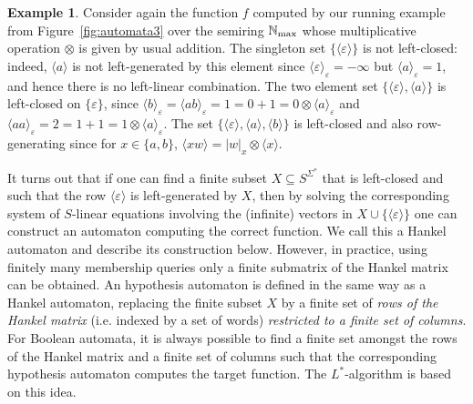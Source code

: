 \documentclass[10pt,a4paper]{amsart}
\theoremstyle{definition}
\newtheorem{exa}[thm]{Example}
\numberwithin{equation}{section}
\numberwithin{theorem}{section}
\begin{document}
\begin{exa}
Consider again the function $f$ computed by our running example from Figure~\ref{fig:automata3} over the semiring $\mathbb{N}_{\rm max}$ whose multiplicative operation $\otimes$ is given by usual addition. The singleton set $\{\langle \varepsilon \rangle\}$ is not left-closed: indeed, $\langle a \rangle$ is not left-generated by this element since $\langle \varepsilon \rangle_\varepsilon = -\infty$ but $\langle a \rangle_\varepsilon = 1$, and hence there is no left-linear combination. The two element set $\{\langle \varepsilon \rangle, \langle a \rangle\}$ is left-closed  on $\{\varepsilon\}$, since $\langle b \rangle_\varepsilon =  \langle ab \rangle_\varepsilon = 1 = 0+1 = 0 \otimes \langle a \rangle_\varepsilon$ and $\langle aa \rangle_\varepsilon = 2 = 1+1 = 1 \otimes \langle a \rangle_\varepsilon$. The set $\{\langle \varepsilon \rangle, \langle a \rangle, \langle b \rangle \}$ is left-closed  and also row-generating since for $x \in \{a,b\}$, $\langle xw \rangle = |w|_x \otimes \langle x \rangle$.
\end{exa}

It turns out that if one can find a finite  subset  $X \subseteq S^{\Sigma^*}$ that is left-closed and such that the row $\langle \varepsilon \rangle$ is left-generated by $X$, then by solving the corresponding system of $S$-linear equations involving the (infinite) vectors in $X \cup \{\langle \varepsilon\rangle\}$ one can construct an automaton computing the correct function. We call this a Hankel automaton and describe its construction below. However, in practice, using finitely many membership queries only a finite submatrix of the Hankel matrix can be obtained. An hypothesis automaton is defined in the same way as a Hankel automaton, replacing the finite subset $X$ by a finite set of \emph{rows of the Hankel matrix} (i.e. indexed by a set of words) \emph{restricted to a finite set of columns}. For Boolean automata, it is always possible to find a finite set amongst the rows of the Hankel matrix and a finite set of columns such that the corresponding hypothesis automaton computes the target function. The $L^*$-algorithm is based on this idea. 
\end{document}
